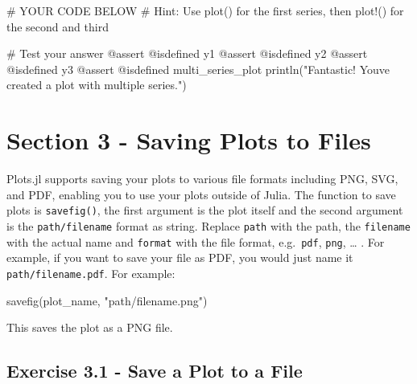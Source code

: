 \documentclass[
]{report}
\newenvironment{Shaded}{\begin{snugshade}}{\end{snugshade}}
\newcommand{\CommentTok}[1]{\textcolor[rgb]{0.37,0.37,0.37}{#1}}
\newcommand{\FunctionTok}[1]{\textcolor[rgb]{0.28,0.35,0.67}{#1}}
\newcommand{\NormalTok}[1]{\textcolor[rgb]{0.00,0.23,0.31}{#1}}
\newcommand{\PreprocessorTok}[1]{\textcolor[rgb]{0.68,0.00,0.00}{#1}}
\newcommand{\StringTok}[1]{\textcolor[rgb]{0.13,0.47,0.30}{#1}}
\begin{document}
\begin{Shaded}
\begin{Highlighting}[]
\CommentTok{\# YOUR CODE BELOW}
\CommentTok{\# Hint: Use plot() for the first series, then plot!() for the second and third}
\end{Highlighting}
\end{Shaded}

\begin{Shaded}
\begin{Highlighting}[]
\CommentTok{\# Test your answer}
\PreprocessorTok{@assert} \PreprocessorTok{@isdefined}\NormalTok{ y1}
\PreprocessorTok{@assert} \PreprocessorTok{@isdefined}\NormalTok{ y2}
\PreprocessorTok{@assert} \PreprocessorTok{@isdefined}\NormalTok{ y3}
\PreprocessorTok{@assert} \PreprocessorTok{@isdefined}\NormalTok{ multi\_series\_plot}
\FunctionTok{println}\NormalTok{(}\StringTok{"Fantastic! You\textquotesingle{}ve created a plot with multiple series."}\NormalTok{)}
\end{Highlighting}
\end{Shaded}

\chapter{Section 3 - Saving Plots to
Files}\label{section-3---saving-plots-to-files}

Plots.jl supports saving your plots to various file formats including
PNG, SVG, and PDF, enabling you to use your plots outside of Julia. The
function to save plots is \texttt{savefig()}, the first argument is the
plot itself and the second argument is the \texttt{path/filename} format
as string. Replace \texttt{path} with the path, the \texttt{filename}
with the actual name and \texttt{format} with the file format,
e.g.~\texttt{pdf}, \texttt{png}, \ldots{} . For example, if you want to
save your file as PDF, you would just name it
\texttt{path/filename.pdf}. For example:

\begin{Shaded}
\begin{Highlighting}[]
\FunctionTok{savefig}\NormalTok{(plot\_name, }\StringTok{"path/filename.png"}\NormalTok{)}
\end{Highlighting}
\end{Shaded}

This saves the plot as a PNG file.

\section{Exercise 3.1 - Save a Plot to a
File}\label{exercise-3.1---save-a-plot-to-a-file}
\end{document}
